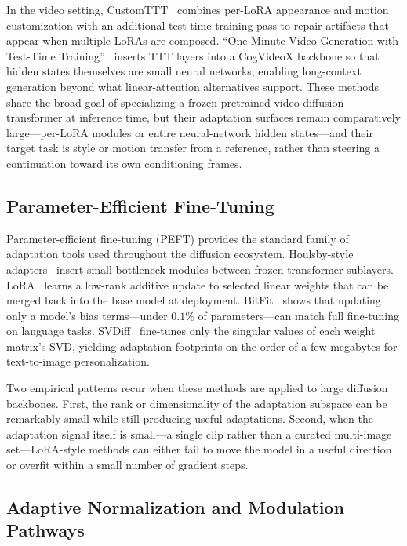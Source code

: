 In the video setting, CustomTTT~\citep{bi2025customttt} combines per-LoRA
appearance and motion customization with an additional test-time training
pass to repair artifacts that appear when multiple LoRAs are composed.
``One-Minute Video Generation with Test-Time
Training''~\citep{dalal2025oneminuteTTT} inserts TTT layers into a
CogVideoX backbone so that hidden states themselves are small neural
networks, enabling long-context generation beyond what linear-attention
alternatives support. These methods share the broad goal of specializing a
frozen pretrained video diffusion transformer at inference time, but their
adaptation surfaces remain comparatively large---per-LoRA modules or entire
neural-network hidden states---and their target task is style or motion
transfer from a reference, rather than steering a continuation toward its
own conditioning frames.

\subsection{Parameter-Efficient Fine-Tuning}
\label{sec:rw_peft}

Parameter-efficient fine-tuning (PEFT) provides the standard family of
adaptation tools used throughout the diffusion ecosystem. Houlsby-style
adapters~\citep{houlsby2019adapters} insert small bottleneck modules
between frozen transformer sublayers. LoRA~\citep{hu2022lora} learns a
low-rank additive update to selected linear weights that can be merged
back into the base model at deployment. BitFit~\citep{zaken2022bitfit}
shows that updating only a model's bias terms---under $0.1\%$ of
parameters---can match full fine-tuning on language tasks.
SVDiff~\citep{han2023svdiff} fine-tunes only the singular values of each
weight matrix's SVD, yielding adaptation footprints on the order of a few
megabytes for text-to-image personalization.

Two empirical patterns recur when these methods are applied to large
diffusion backbones. First, the rank or dimensionality of the adaptation
subspace can be remarkably small while still producing useful adaptations.
Second, when the adaptation signal itself is small---a single clip rather
than a curated multi-image set---LoRA-style methods can either fail to
move the model in a useful direction or overfit within a small number of
gradient steps.

\subsection{Adaptive Normalization and Modulation Pathways}
\label{sec:rw_modulation}

